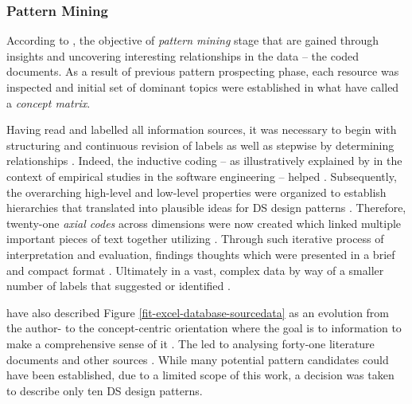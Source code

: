\subsubsection{Pattern Mining} 
According to \textcite[5]{InventadoPeter2015}, the objective of \emph{pattern mining} stage  that are gained through insights and uncovering interesting relationships in the data -- the coded documents.
As a result of previous pattern prospecting phase, each resource was inspected and initial set of dominant topics were established in what \textcite{WebsterJaineWatson2002} have called a \emph{concept matrix}.

Having read and labelled all information sources, it was necessary to begin with structuring and continuous revision of labels as well as stepwise  by determining relationships \parencites[242]{t06}{Okoli2010}.
Indeed, the inductive coding -- as illustratively explained by \textcites[563]{SeamanC1999}{SeamanPresentation2013} in the context of empirical studies in the software engineering -- helped . 
Subsequently, the overarching high-level and low-level properties were organized to establish hierarchies that translated into plausible ideas for \ac{DS} design patterns \parencites{t06}{MatavireBrown2011}.
Therefore, twenty-one \emph{axial codes} across dimensions were now created  which linked multiple important pieces of text together utilizing  \parencite[17]{WebsterJaineWatson2002}. 
Through such iterative process of interpretation and evaluation, findings  thoughts which were presented in a brief and compact format \parencites[238]{t06}. 
Ultimately  in a vast, complex data by way of a smaller number of labels that suggested  or identified  \parencites[242]{t06}[5]{InventadoPeter2015}. 

\textcite{WebsterJaineWatson2002} have also described Figure \ref{fit-excel-database-sourcedata} as an evolution from the author- to the concept-centric orientation where the goal is to  information to make a comprehensive sense of it \parencites[30]{Okoli2010}.
The  led to analysing forty-one literature documents and other sources  \parencites[10]{Fowler2002}[30]{Okoli2010}. 
While many potential pattern candidates could have been established, due to a limited scope of this work, a decision was taken to describe only ten \ac{DS} design patterns. 

